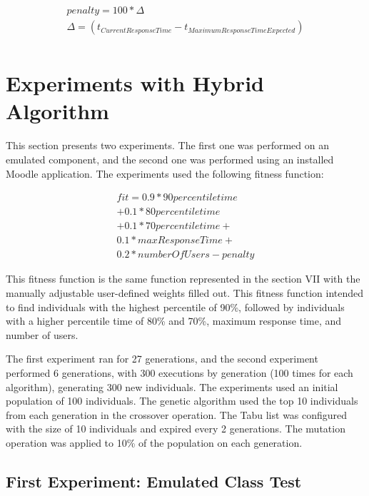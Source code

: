 \documentclass{report}
\begin{document}
\begin{equation}
\begin{aligned}
penalty=100 * \Delta \\
\Delta=(t_{Current Response Time} - t_{Maximum Response Time Expected})\\
\end{aligned}
\end{equation}

\section{Experiments with Hybrid Algorithm}

This section presents two experiments. The first one was performed on an emulated component, and the second one was performed using an installed Moodle application. The experiments used the following fitness function:

\begin{equation}
\begin{aligned}
fit=0.9* 90percentiletime\\
+0.1*80percentiletime\\+
0.1*70percentiletime+\\
0.1*maxResponseTime+\\
0.2*numberOfUsers-penalty
\end{aligned}
\end{equation}

This fitness function is the same function represented in the section VII with the manually adjustable user-defined weights filled out. This fitness function intended to find individuals with the highest percentile of 90\%, followed by individuals with a higher percentile time of 80\% and 70\%, maximum response time, and number of users.

The first experiment ran for 27 generations, and the second experiment  performed 6 generations, with 300 executions by generation (100 times for each algorithm),  generating 300 new individuals. The experiments used an initial population of 100 individuals. The genetic algorithm used the top 10 individuals from each generation in the crossover operation. The Tabu list was configured with the size of 10 individuals and expired every 2 generations.  The mutation operation was applied to 10\% of the population on each generation. 

\subsection{First Experiment: Emulated Class Test}
\end{document}
